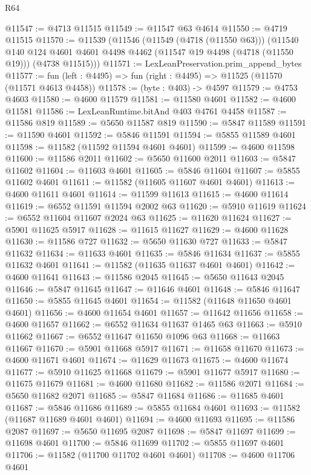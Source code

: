 \begin{lexlean}{R64}
\begin{coremodule}
@11547 := @4713 @11515
@11549 := @11547 @63 @4614
@11550 := @4719 @11515
@11570 := @11539
    (@11546
      (@11549 (@4718 (@11550 @63)))
      (@11540
        @140
        @124
        @4601
        @4601
        @4498
        @4462
        (@11547 @19 @4498 (@4718 (@11550 @19)))
        (@4738 @11515)))
@11571 := LexLeanPreservation.prim_append_bytes
@11577 := fun (left : @4495) => fun (right : @4495) => @11525 (@11570 (@11571 @4613 @4458))
@11578 := (byte : @403) -> @4597
@11579 := @4753 @4603
@11580 := @4600 @11579
@11581 := @11580 @4601
@11582 := @4600 @11581
@11586 := LexLeanRuntime.bitAnd @403 @4761 @4458
@11587 := @11586 @819
@11589 := @5650 @11587 @819
@11590 := @5847 @11589
@11591 := @11590 @4601
@11592 := @5846 @11591
@11594 := @5855 @11589 @4601
@11598 := @11582 (@11592 @11594 @4601 @4601)
@11599 := @4600 @11598
@11600 := @11586 @2011
@11602 := @5650 @11600 @2011
@11603 := @5847 @11602
@11604 := @11603 @4601
@11605 := @5846 @11604
@11607 := @5855 @11602 @4601
@11611 := @11582 (@11605 @11607 @4601 @4601)
@11613 := @4600 @11611 @4601
@11614 := @11599 @11613
@11615 := @4600 @11614
@11619 := @6552 @11591 @11594 @2002 @63
@11620 := @5910 @11619
@11624 := @6552 @11604 @11607 @2024 @63
@11625 := @11620 @11624
@11627 := @5901 @11625 @5917
@11628 := @11615 @11627
@11629 := @4600 @11628
@11630 := @11586 @727
@11632 := @5650 @11630 @727
@11633 := @5847 @11632
@11634 := @11633 @4601
@11635 := @5846 @11634
@11637 := @5855 @11632 @4601
@11641 := @11582 (@11635 @11637 @4601 @4601)
@11642 := @4600 @11641
@11643 := @11586 @2045
@11645 := @5650 @11643 @2045
@11646 := @5847 @11645
@11647 := @11646 @4601
@11648 := @5846 @11647
@11650 := @5855 @11645 @4601
@11654 := @11582 (@11648 @11650 @4601 @4601)
@11656 := @4600 @11654 @4601
@11657 := @11642 @11656
@11658 := @4600 @11657
@11662 := @6552 @11634 @11637 @1465 @63
@11663 := @5910 @11662
@11667 := @6552 @11647 @11650 @1096 @63
@11668 := @11663 @11667
@11670 := @5901 @11668 @5917
@11671 := @11658 @11670
@11673 := @4600 @11671 @4601
@11674 := @11629 @11673
@11675 := @4600 @11674
@11677 := @5910 @11625 @11668
@11679 := @5901 @11677 @5917
@11680 := @11675 @11679
@11681 := @4600 @11680
@11682 := @11586 @2071
@11684 := @5650 @11682 @2071
@11685 := @5847 @11684
@11686 := @11685 @4601
@11687 := @5846 @11686
@11689 := @5855 @11684 @4601
@11693 := @11582 (@11687 @11689 @4601 @4601)
@11694 := @4600 @11693
@11695 := @11586 @2087
@11697 := @5650 @11695 @2087
@11698 := @5847 @11697
@11699 := @11698 @4601
@11700 := @5846 @11699
@11702 := @5855 @11697 @4601
@11706 := @11582 (@11700 @11702 @4601 @4601)
@11708 := @4600 @11706 @4601

\end{coremodule}
\end{lexlean}
